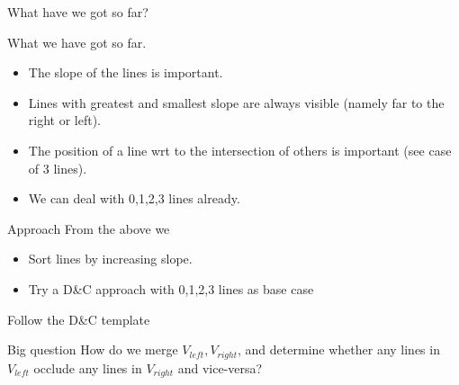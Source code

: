 \documentclass{article}
\begin{document}
\begin{frame}{What have we got so far?}

  \begin{block}{What we have got so far.}
    \begin{itemize}
    \item The slope of the lines is important.
    \item Lines with greatest and smallest slope are always visible
      (namely far to the right or left).
    \item The position of a line wrt to the intersection of others is
      important (see case of 3 lines).
    \item We can deal with 0,1,2,3 lines already.
    \end{itemize}
  \end{block}
  \pause
  \begin{block}{Approach}
    From the above we
    \begin{itemize}
    \item Sort lines by increasing slope.
    \item Try a D\&C approach with 0,1,2,3 lines as base case
    \end{itemize}
  \end{block}
\end{frame}


\begin{frame}{Follow the D\&C template}

  \begin{algorithm}[H]
    \caption{Nascent Algorithm D\&C}
    \begin{algorithmic}
      \footnotesize

      \EndIf
      \EndProcedure
    \end{algorithmic}
    \end{algorithm}
    \pause
    \footnotesize
    \begin{block}{Big question}
      How do we merge $V_{left}, V_{right}$, and determine whether any
      lines in $V_{left}$ occlude any lines in $V_{right}$ and vice-versa?
    \end{block}
  \end{frame}
\end{document}

